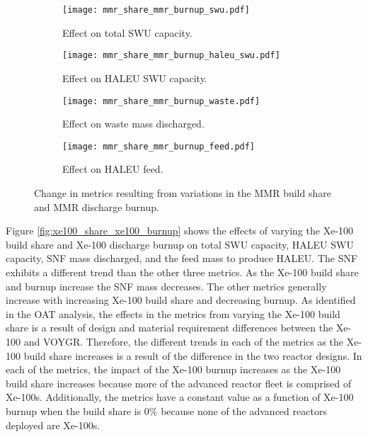 \begin{figure}
    \ContinuedFloat    
    \begin{subfigure}[t]{0.48\textwidth}
        \centering
        \texttt{[image: mmr\_share\_mmr\_burnup\_swu.pdf]}
        \caption{Effect on total SWU capacity.}
        \label{fig:mmr_share_mmr_burnup_swu}
    \end{subfigure}
    \hfill
    \begin{subfigure}[t]{0.48\textwidth}
        \centering
        \texttt{[image: mmr\_share\_mmr\_burnup\_haleu\_swu.pdf]}
        \caption{Effect on HALEU SWU capacity.}
        \label{fig:mmr_share_mmr_burnup_haleu_swu}
    \end{subfigure}
    
    \begin{subfigure}[t]{0.48\textwidth}
        \centering
        \texttt{[image: mmr\_share\_mmr\_burnup\_waste.pdf]}
        \caption{Effect on waste mass discharged.}
        \label{fig:mmr_share_mmr_burnup_waste}
    \end{subfigure}
    \hfill
    \begin{subfigure}[t]{0.48\textwidth}
        \centering
        \texttt{[image: mmr\_share\_mmr\_burnup\_feed.pdf]}
        \caption{Effect on HALEU feed.}
        \label{fig:mmr_share_mmr_burnup_feed}
    \end{subfigure}
    \caption{Change in metrics resulting from variations in the 
    MMR build share and MMR discharge burnup.}
    \label{fig:mmr_share_mmr_burnup}
\end{figure}

Figure \ref{fig:xe100_share_xe100_burnup} shows the effects of varying 
the Xe-100 build share and Xe-100 discharge burnup on total \gls{SWU}
capacity, \gls{HALEU} \gls{SWU} capacity, \gls{SNF} mass discharged, and
the feed mass to produce \gls{HALEU}. The \gls{SNF} exhibits a different 
trend than the other three metrics. As the Xe-100 build share and 
burnup increase the \gls{SNF} mass decreases. The other metrics generally
increase with increasing Xe-100 build share and decreasing burnup. 
As identified in the \gls{OAT} analysis, the effects in the metrics from 
varying the Xe-100 build share is a result of design and material 
requirement differences between the Xe-100 and VOYGR. Therefore, the 
different trends in each of the metrics as the Xe-100 build share increases 
is a result of the difference in the two reactor designs. 
In each of 
the metrics, the impact of the Xe-100 burnup increases as the 
Xe-100 build share increases because more of the advanced reactor fleet 
is comprised of Xe-100s. Additionally, the metrics have a constant value 
as a function of Xe-100 burnup when the build share is 0\% because none 
of the advanced reactors deployed are Xe-100s. 

